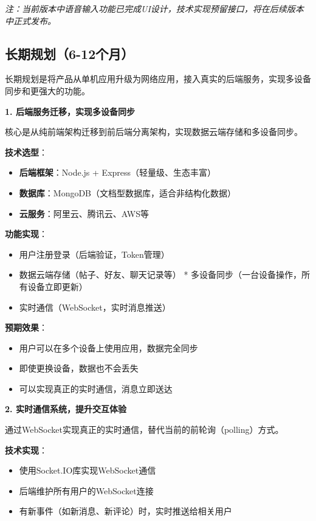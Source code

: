 \documentclass[12pt,a4paper]{article}
\begin{document}
\textit{注：当前版本中语音输入功能已完成UI设计，技术实现预留接口，将在后续版本中正式发布。}

\subsection{长期规划（6-12个月）}

长期规划是将产品从单机应用升级为网络应用，接入真实的后端服务，实现多设备同步和更强大的功能。

\textbf{1. 后端服务迁移，实现多设备同步}

核心是从纯前端架构迁移到前后端分离架构，实现数据云端存储和多设备同步。

\textbf{技术选型}：
\begin{itemize}
    \item \textbf{后端框架}：Node.js + Express（轻量级、生态丰富）
    \item \textbf{数据库}：MongoDB（文档型数据库，适合非结构化数据）
    \item \textbf{云服务}：阿里云、腾讯云、AWS等
\end{itemize}

\textbf{功能实现}：
\begin{itemize}
    \item 用户注册登录（后端验证，Token管理）
    \item 数据云端存储（帖子、好友、聊天记录等）
    * 多设备同步（一台设备操作，所有设备立即更新）
    \item 实时通信（WebSocket，实时消息推送）
\end{itemize}

\textbf{预期效果}：
\begin{itemize}
    \item 用户可以在多个设备上使用应用，数据完全同步
    \item 即使更换设备，数据也不会丢失
    \item 可以实现真正的实时通信，消息立即送达
\end{itemize}

\textbf{2. 实时通信系统，提升交互体验}

通过WebSocket实现真正的实时通信，替代当前的前轮询（polling）方式。

\textbf{技术实现}：
\begin{itemize}
    \item 使用Socket.IO库实现WebSocket通信
    \item 后端维护所有用户的WebSocket连接
    \item 有新事件（如新消息、新评论）时，实时推送给相关用户
\end{itemize}
\end{document}
